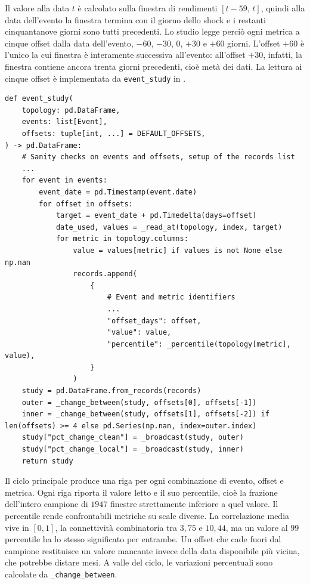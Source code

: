 Il valore alla data $t$ è calcolato sulla finestra di rendimenti $[t-59,\,t]$, quindi alla data dell'evento la finestra termina con il giorno dello shock e i restanti cinquantanove giorni sono tutti precedenti. Lo studio legge perciò ogni metrica a cinque offset dalla data dell'evento, $-60$, $-30$, $0$, $+30$ e $+60$ giorni. L'offset $+60$ è l'unico la cui finestra è interamente successiva all'evento: all'offset $+30$, infatti, la finestra contiene ancora trenta giorni precedenti, cioè metà dei dati. La lettura ai cinque offset è implementata da \texttt{event\_study} in .

\begin{listing}[H]
\begin{verbatim}
def event_study(
    topology: pd.DataFrame,
    events: list[Event],
    offsets: tuple[int, ...] = DEFAULT_OFFSETS,
) -> pd.DataFrame:
    # Sanity checks on events and offsets, setup of the records list
    ...
    for event in events:
        event_date = pd.Timestamp(event.date)
        for offset in offsets:
            target = event_date + pd.Timedelta(days=offset)
            date_used, values = _read_at(topology, index, target)
            for metric in topology.columns:
                value = values[metric] if values is not None else np.nan
                records.append(
                    {
                        # Event and metric identifiers
                        ...
                        "offset_days": offset,
                        "value": value,
                        "percentile": _percentile(topology[metric], value),
                    }
                )
    study = pd.DataFrame.from_records(records)
    outer = _change_between(study, offsets[0], offsets[-1])
    inner = _change_between(study, offsets[1], offsets[-2]) if len(offsets) >= 4 else pd.Series(np.nan, index=outer.index)
    study["pct_change_clean"] = _broadcast(study, outer)
    study["pct_change_local"] = _broadcast(study, inner)
    return study
\end{verbatim}
\caption{\texttt{event\_study}}
\label{lst:event-study}
\end{listing}

Il ciclo principale produce una riga per ogni combinazione di evento, offset e metrica. Ogni riga riporta il valore letto e il suo percentile, cioè la frazione dell'intero campione di $1947$ finestre strettamente inferiore a quel valore. Il percentile rende confrontabili metriche su scale diverse. La correlazione media vive in $[0,1]$, la connettività combinatoria tra $3{,}75$ e $10{,}44$, ma un valore al $99$\textdegree{} percentile ha lo stesso significato per entrambe. Un offset che cade fuori dal campione restituisce un valore mancante invece della data disponibile più vicina, che potrebbe distare mesi. A valle del ciclo, le variazioni percentuali sono calcolate da \texttt{\_change\_between}.

